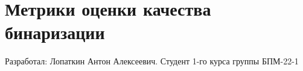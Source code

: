 \chapter{Метрики оценки качества бинаризации}
\hypertarget{index}{}\label{index}
Разработал\+: Лопаткин Антон Алексеевич. Студент 1-\/го курса группы БПМ-\/22-\/1 